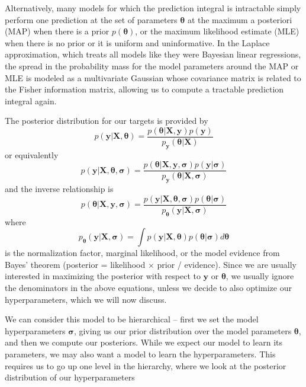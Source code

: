 \documentclass{article}
\begin{document}
Alternatively, many models for which the prediction integral is intractable simply perform one prediction at the set of parameters $\boldsymbol{\theta}$ at the maximum a posteriori (MAP) when there is a prior $p(\boldsymbol{\theta})$, or the maximum likelihood estimate (MLE) when there is no prior or it is uniform and uninformative. In the Laplace approximation, which treats all models like they were Bayesian linear regressions, the spread in the probability mass for the model parameters around the MAP or MLE is modeled as a multivariate Gaussian whose covariance matrix is related to the Fisher information matrix, allowing us to compute a tractable prediction integral again.

The posterior distribution for our targets is provided by  \begin{equation} p(\mathbf{y}|\mathbf{X}, \boldsymbol{\theta})=\frac{p(\boldsymbol{\theta}|\mathbf{X},\mathbf{y})p(\mathbf{y})}{p_\mathbf{y}(\boldsymbol{\theta}|\mathbf{X})}\end{equation}or equivalently \begin{equation} p(\mathbf{y}|\mathbf{X}, \boldsymbol{\theta},\boldsymbol{\sigma})=\frac{p(\boldsymbol{\theta}|\mathbf{X},\mathbf{y},\boldsymbol{\sigma})p(\mathbf{y}|\boldsymbol{\sigma})}{p_\mathbf{y}(\boldsymbol{\theta}|\mathbf{X},\boldsymbol{\sigma})}\end{equation}and the inverse relationship is
\begin{equation}    p(\boldsymbol{\theta}|\mathbf{X},\mathbf{y},\boldsymbol{\sigma})=\frac{p(\mathbf{y}|\mathbf{X},\boldsymbol{\theta},\boldsymbol{\sigma})p(\boldsymbol{\theta}|\boldsymbol{\sigma})}{p_{\boldsymbol{\theta}}(\mathbf{y}|\mathbf{X},\boldsymbol{\sigma})}
\end{equation}where
\begin{equation}
\label{eq:define_marginal_likelihood}
  p_{\boldsymbol{\theta}}(\mathbf{y}|\mathbf{X},\boldsymbol{\sigma})=\int p(\mathbf{y}|\mathbf{X},\boldsymbol{\theta})p(\boldsymbol{\theta}|\boldsymbol{\sigma})d\boldsymbol{\theta}
\end{equation}is the normalization factor, marginal likelihood, or the model evidence from Bayes' theorem (posterior = likelihood $\times$ prior / evidence). Since we are usually interested in maximizing the posterior with respect to $\mathbf{y}$ or $\boldsymbol{\theta}$, we usually ignore the denominators in the above equations, unless we decide to also optimize our hyperparameters, which we will now discuss.

We can consider this model to be hierarchical -- first we set the model hyperparameters $\boldsymbol{\sigma}$, giving us our prior distribution  over the model parameters $\boldsymbol{\theta}$, and then we compute our posteriors. While we expect our model to learn its parameters, we may also want a model to learn the hyperparameters. This requires us to go up one level in the hierarchy, where we look at the posterior distribution of our hyperparameters
\end{document}
